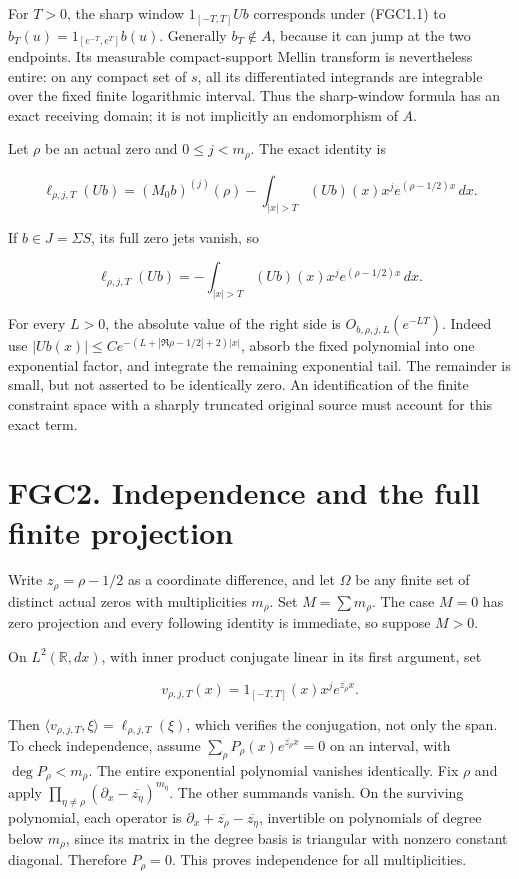 For \(T>0\), the sharp window \(1_{[-T,T]}Ub\) corresponds under
(FGC1.1) to \(b_T(u)=1_{[e^{-T},e^T]}b(u)\). Generally \(b_T\notin A\),
because it can jump at the two endpoints. Its measurable compact-support
Mellin transform is nevertheless entire: on any compact set of \(s\),
all its differentiated integrands are integrable over the fixed finite
logarithmic interval. Thus the sharp-window formula has an exact
receiving domain; it is not implicitly an endomorphism of \(A\).

Let \(\rho\) be an actual zero and \(0\leq j<m_\rho\). The exact
identity is

\[
 \ell_{\rho,j,T}(Ub)
 =(M_0b)^{(j)}(\rho)
 -\int_{|x|>T}(Ub)(x)x^j e^{(\rho-1/2)x}\,dx.
\tag{FGC1.4}
\]

If \(b\in J=\Sigma S\), its full zero jets vanish, so

\[
 \ell_{\rho,j,T}(Ub)
 =-\int_{|x|>T}(Ub)(x)x^j e^{(\rho-1/2)x}\,dx.
\tag{FGC1.5}
\]

For every \(L>0\), the absolute value of the right side is
\(O_{b,\rho,j,L}(e^{-LT})\). Indeed use
\(|Ub(x)|\leq C e^{-(L+|\Re\rho-1/2|+2)|x|}\), absorb the fixed
polynomial into one exponential factor, and integrate the remaining
exponential tail. The remainder is small, but not asserted to be
identically zero. An identification of the finite constraint space with
a sharply truncated original source must account for this exact term.

\section{FGC2. Independence and the full finite
projection}\label{fgc2.-independence-and-the-full-finite-projection}

Write \(z_\rho=\rho-1/2\) as a coordinate difference, and let \(\Omega\)
be any finite set of distinct actual zeros with multiplicities
\(m_\rho\). Set \(M=\sum m_\rho\). The case \(M=0\) has zero projection
and every following identity is immediate, so suppose \(M>0\).

On \(L^2(\mathbb R,dx)\), with inner product conjugate linear in its
first argument, set

\[
 v_{\rho,j,T}(x)=1_{[-T,T]}(x)x^j e^{\overline{z_\rho}x}.
\]

Then \(\langle v_{\rho,j,T},\xi\rangle=\ell_{\rho,j,T}(\xi)\), which
verifies the conjugation, not only the span. To check independence,
assume \(\sum_\rho P_\rho(x)e^{\overline{z_\rho}x}=0\) on an interval,
with \(\deg P_\rho<m_\rho\). The entire exponential polynomial vanishes
identically. Fix \(\rho\) and apply
\(\prod_{\eta\ne\rho}(\partial_x-\overline{z_\eta})^{m_\eta}\). The
other summands vanish. On the surviving polynomial, each operator is
\(\partial_x+\overline{z_\rho}-\overline{z_\eta}\), invertible on
polynomials of degree below \(m_\rho\), since its matrix in the degree
basis is triangular with nonzero constant diagonal. Therefore
\(P_\rho=0\). This proves independence for all multiplicities.

